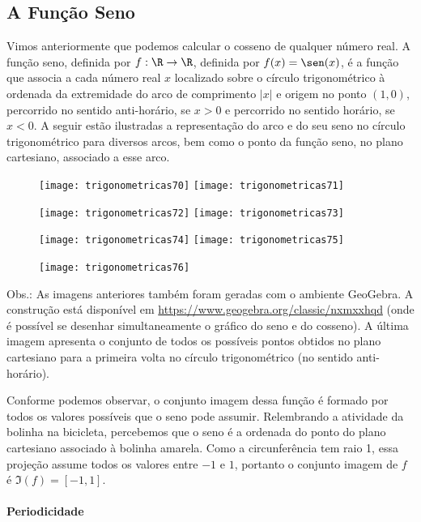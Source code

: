 \clearpage
\subsection{A Função Seno}
Vimos anteriormente que podemos calcular o cosseno de qualquer número real. A função seno, definida por $f:\R\to \R$, definida por $f(x)=\sen(x)$, é a função que associa a cada número real $x$ localizado sobre o círculo trigonométrico à ordenada da extremidade do arco de comprimento $|x|$ e origem no ponto $(1,0)$, percorrido no sentido anti-horário, se $x>0$ e percorrido no sentido horário, se $x<0$. A seguir estão ilustradas a representação do arco e do seu seno no círculo trigonométrico para diversos arcos, bem como o ponto da função seno, no plano cartesiano, associado a esse arco.

\begin{figure}[H]
\centering

\texttt{[image: trigonometricas70]}
\texttt{[image: trigonometricas71]}

\texttt{[image: trigonometricas72]}
\texttt{[image: trigonometricas73]}

\texttt{[image: trigonometricas74]}
\texttt{[image: trigonometricas75]}

\end{figure}

\begin{figure}[H]
\centering

\texttt{[image: trigonometricas76]}
\end{figure}


Obs.: As imagens anteriores também foram geradas com o ambiente GeoGebra. A construção está disponível em \url{https://www.geogebra.org/classic/nxmxxhqd} (onde é possível se desenhar simultaneamente o gráfico do seno e do cosseno). A última imagem apresenta o conjunto de todos os possíveis pontos obtidos no plano cartesiano para a primeira volta no círculo trigonométrico (no sentido anti-horário).

Conforme podemos observar, o conjunto imagem dessa função é formado por todos os valores possíveis que o seno pode assumir. Relembrando a atividade da bolinha na bicicleta, percebemos que o seno é a ordenada do ponto do plano cartesiano associado à bolinha amarela. Como a circunferência tem raio 1, essa projeção assume todos os valores entre $-1$ e $1$, portanto o conjunto imagem de $f$ é  $\Im(f)=[-1,1]$.

\paragraph{Periodicidade}

